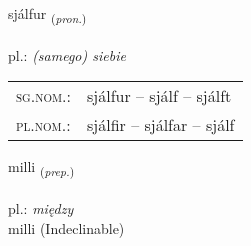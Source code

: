 \documentclass[frontgrid, backgrid]{flacards}\usepackage[]{graphicx}\usepackage[]{xcolor}
\begin{document}
\renewcommand{\blhead}{\vskip5pt {\small\bfseries\footnotesize Fornafn | Pronoun }}
\renewcommand{\bcfoot}{\vskip5pt \hspace{2pt}{\small\bfseries\footnotesize 1K}}


{sjálfur \small{\textsubscript{(\textit{pron.})}} \\[1ex] %
\textphonetic{[sjaulvʏr]} \\
pl.: \emph{(samego) siebie} \\  [2ex]
\renewcommand*{\arraystretch}{0.8}
\begin{tabular}{ll}
\textsc{sg.nom.}: & sjálfur  --  sjálf -- sjálft \\ 
\textsc{pl.nom.}: & sjálfir -- sjálfar -- sjálf
\end{tabular}
}


\renewcommand{\flhead}{\vskip5pt \fboxsep=0pt {\small\bfseries\footnotesize Forsetning | Preposition}}
\renewcommand{\fcfoot}{\vskip5pt \fboxsep=0pt \hspace{2pt}{\small\bfseries\footnotesize 1K}}

\renewcommand{\blhead}{\vskip5pt {\small\bfseries\footnotesize Forsetning | Preposition }}
\renewcommand{\bcfoot}{\vskip5pt \hspace{2pt}{\small\bfseries\footnotesize 1K}}


{milli \small{\textsubscript{(\textit{prep.})}} \\[1ex]
\textphonetic{[mɪtlɪ]} \\
pl.: \emph{między} \\  [2ex]
milli (Indeclinable)}


\renewcommand{\flhead}{\vskip5pt \fboxsep=0pt {\small\bfseries\footnotesize Forsetning | Preposition}}
\renewcommand{\fcfoot}{\vskip5pt \fboxsep=0pt \hspace{2pt}{\small\bfseries\footnotesize 1K}}

\renewcommand{\blhead}{\vskip5pt {\small\bfseries\footnotesize Forsetning | Preposition }}
\renewcommand{\bcfoot}{\vskip5pt \hspace{2pt}{\small\bfseries\footnotesize 1K}}
\end{document}
